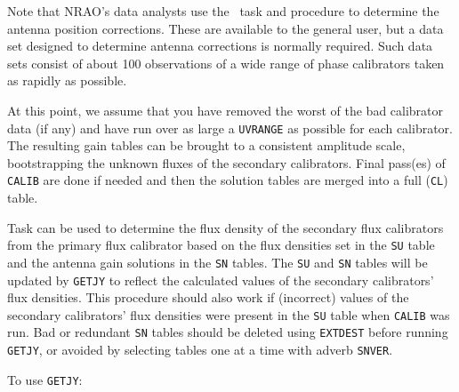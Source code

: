 Note that NRAO's data analysts use the \AIPS\ task {\tt {}}
and procedure {\tt {}} to determine the antenna position
corrections.  These are available to the general user, but a data set
designed to determine antenna corrections is normally required.  Such
data sets consist of about 100 observations of a wide range of phase
calibrators taken as rapidly as possible.


     At this point, we assume that you have removed the worst of the
bad calibrator data (if any) and have run {\tt {}} over as
large a {\tt UVRANGE} as possible for each calibrator.  The resulting
gain tables can be brought to a consistent amplitude scale,
bootstrapping the unknown fluxes of the secondary calibrators.  Final
pass(es) of {\tt CALIB} are done if needed and then the solution
tables are merged into a full  ({\tt CL}) table.


      Task {\tt {}} can be used to determine the flux
density of the secondary flux calibrators from the primary flux
calibrator based on the flux densities set in the {\tt SU} table and
the antenna gain solutions in the {\tt SN} tables.  The {\tt SU} and
{\tt SN} tables will be updated by {\tt GETJY} to reflect the
calculated values of the secondary calibrators' flux densities.  This
procedure should also work if (incorrect) values of the secondary
calibrators' flux densities were present in the {\tt SU} table when
{\tt CALIB} was run. Bad or redundant {\tt SN} tables should be
deleted using {\tt EXTDEST} before running {\tt GETJY}, or avoided by
selecting tables one at a time with adverb \hbox{{\tt SNVER}}.

      To use {\tt GETJY}:

